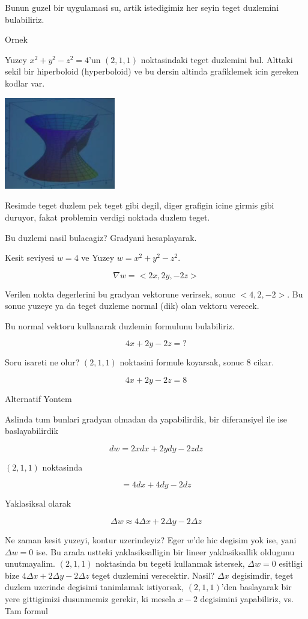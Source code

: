 \documentclass[12pt,fleqn]{article}\usepackage{../common}
\begin{document}
Bunun guzel bir uygulamasi su, artik istedigimiz her seyin teget duzlemini
bulabiliriz. 

Ornek

Yuzey $x^2 + y^2 - z^2 = 4$'un $(2,1,1)$ noktasindaki teget duzlemini
bul. Alttaki sekil bir hiperboloid (hyperboloid) ve bu dersin altinda
grafiklemek icin gereken kodlar var. 

\includegraphics[height=4cm]{12_5.png}

Resimde teget duzlem pek teget gibi degil, diger grafigin icine girmis gibi
duruyor, fakat problemin verdigi noktada duzlem teget. 

Bu duzlemi nasil bulacagiz? Gradyani hesaplayarak. 

Kesit seviyesi $w=4$ ve Yuzey $w = x^2 + y^2 - z^2$. 

\[ \nabla w = <2x, 2y, -2z> \]

Verilen nokta degerlerini bu gradyan vektorune verirsek, sonuc
$<4,2,-2>$. Bu sonuc yuzeye ya da teget duzleme normal (dik) olan 
vektoru verecek. 

Bu normal vektoru kullanarak duzlemin formulunu bulabiliriz. 

\[ 4x + 2y - 2z = ? \]

Soru isareti ne olur? $(2,1,1)$ noktasini formule koyarsak, sonuc 8 cikar.

\[ 4x + 2y - 2z = 8 \]

Alternatif Yontem

Aslinda tum bunlari gradyan olmadan da yapabilirdik, bir diferansiyel ile
ise baslayabilirdik

\[ dw = 2x dx + 2y dy -2z dz \]

$(2,1,1)$ noktasinda

\[ = 4dx + 4dy - 2dz \]

Yaklasiksal olarak 

\[ \Delta w \approx 4 \Delta x + 2\Delta y - 2\Delta z  \]

Ne zaman kesit yuzeyi, kontur uzerindeyiz? Eger $w$'de hic degisim yok ise,
yani $\Delta w = 0$ ise. Bu arada ustteki yaklasiksalligin bir lineer
yaklasiksallik oldugunu unutmayalim. $(2,1,1)$ noktasinda bu tegeti
kullanmak istersek,  $\Delta w = 0$ esitligi bize $4 \Delta x + 2\Delta y -
2\Delta z $ 
teget duzlemini verecektir. Nasil? $\Delta x$ degisimdir, teget duzlem
uzerinde degisimi tanimlamak istiyorsak, $(2,1,1)$'den baslayarak bir yere
gittigimizi dusunmemiz gerekir, ki mesela $x-2$ degisimini yapabiliriz,
vs. Tam formul
\end{document}
